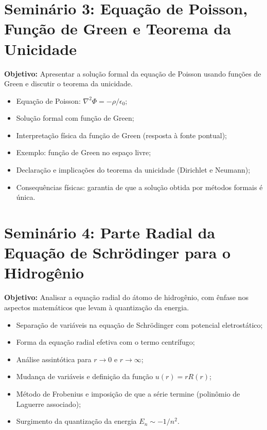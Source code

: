\vspace{1cm}

\section*{Seminário 3: Equação de Poisson, Função de Green e Teorema da Unicidade}

\textbf{Objetivo:} Apresentar a solução formal da equação de Poisson usando funções de Green e discutir o teorema da unicidade.

\begin{itemize}
	\item Equação de Poisson: \( \nabla^2 \Phi = -\rho/\epsilon_0 \);
	\item Solução formal com função de Green;
	\item Interpretação física da função de Green (resposta à fonte pontual);
	\item Exemplo: função de Green no espaço livre;
	\item Declaração e implicações do teorema da unicidade (Dirichlet e Neumann);
	\item Consequências físicas: garantia de que a solução obtida por métodos formais é única.
\end{itemize}

\vspace{1cm}

\section*{Seminário 4: Parte Radial da Equação de Schrödinger para o Hidrogênio}

\textbf{Objetivo:} Analisar a equação radial do átomo de hidrogênio, com ênfase nos aspectos matemáticos que levam à quantização da energia.

\begin{itemize}
	\item Separação de variáveis na equação de Schrödinger com potencial eletrostático;
	\item Forma da equação radial efetiva com o termo centrífugo;
	\item Análise assintótica para \( r \to 0 \) e \( r \to \infty \);
	\item Mudança de variáveis e definição da função \( u(r) = r R(r) \);
	\item Método de Frobenius e imposição de que a série termine (polinômio de Laguerre associado);
	\item Surgimento da quantização da energia \( E_n \sim -1/n^2 \).
\end{itemize}


